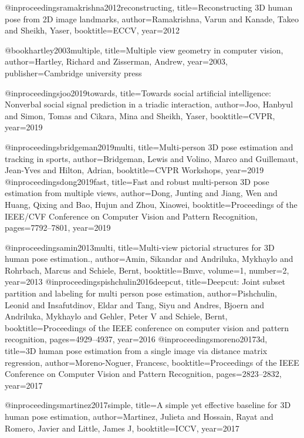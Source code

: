 @inproceedings{ramakrishna2012reconstructing,
  title={Reconstructing {3D} human pose from {2D} image landmarks},
  author={Ramakrishna, Varun and Kanade, Takeo and Sheikh, Yaser},
  booktitle=ECCV,
  year={2012}
}

@book{hartley2003multiple,
  title={Multiple view geometry in computer vision},
  author={Hartley, Richard and Zisserman, Andrew},
  year={2003},
  publisher={Cambridge university press}
}

@inproceedings{joo2019towards,
  title={Towards social artificial intelligence: Nonverbal social signal prediction in a triadic interaction},
  author={Joo, Hanbyul and Simon, Tomas and Cikara, Mina and Sheikh, Yaser},
  booktitle=CVPR,
  year={2019}
}

@inproceedings{bridgeman2019multi,
  title={Multi-person {3D} pose estimation and tracking in sports},
  author={Bridgeman, Lewis and Volino, Marco and Guillemaut, Jean-Yves and Hilton, Adrian},
  booktitle={CVPR Workshops},
  year={2019}
}
@inproceedings{dong2019fast,
  title={Fast and robust multi-person {3D} pose estimation from multiple views},
  author={Dong, Junting and Jiang, Wen and Huang, Qixing and Bao, Hujun and Zhou, Xiaowei},
  booktitle={Proceedings of the IEEE/CVF Conference on Computer Vision and Pattern Recognition},
  pages={7792--7801},
  year={2019}
}

@inproceedings{amin2013multi,
  title={Multi-view pictorial structures for {3D} human pose estimation.},
  author={Amin, Sikandar and Andriluka, Mykhaylo and Rohrbach, Marcus and Schiele, Bernt},
  booktitle={Bmvc},
  volume={1},
  number={2},
  year={2013}
}
@inproceedings{pishchulin2016deepcut,
  title={Deepcut: Joint subset partition and labeling for multi person pose estimation},
  author={Pishchulin, Leonid and Insafutdinov, Eldar and Tang, Siyu and Andres, Bjoern and Andriluka, Mykhaylo and Gehler, Peter V and Schiele, Bernt},
  booktitle={Proceedings of the IEEE conference on computer vision and pattern recognition},
  pages={4929--4937},
  year={2016}
}
@inproceedings{moreno20173d,
  title={{3D} human pose estimation from a single image via distance matrix regression},
  author={Moreno-Noguer, Francesc},
  booktitle={Proceedings of the IEEE Conference on Computer Vision and Pattern Recognition},
  pages={2823--2832},
  year={2017}
}

@inproceedings{martinez2017simple,
  title={A simple yet effective baseline for {3D} human pose estimation},
  author={Martinez, Julieta and Hossain, Rayat and Romero, Javier and Little, James J},
  booktitle=ICCV,
  year={2017}
}

